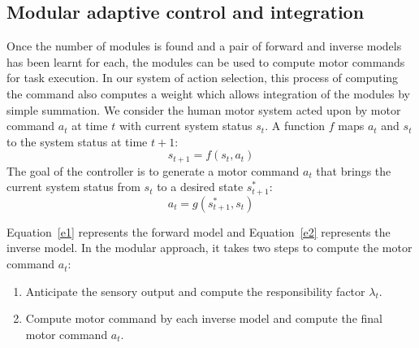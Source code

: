 \subsection{Modular adaptive control and integration}
\label{sec:control}

Once the number of modules is found and a pair of forward and inverse
models has been learnt for each, the modules can be used to compute
motor commands for task execution.  In our system of action selection,
this process of computing the command also computes a weight which
allows integration of the modules by simple summation.  We consider
the human motor system acted upon by motor command $a_t$ at time $t$
with current system status $s_t$. A function $f$ maps $a_t$ and $s_t$
to the system status at time $t+1$:
\begin{equation}
\label{e1}
s_{t+1} = f\left(s_t,a_t\right)
\end{equation}
The goal of the controller is to generate a motor command $a_t$ that
brings the current system status from $s_t$ to a desired state $s^*_{t+1}$:
\begin{equation}
\label{e2}
a_t = g\left({s^*_{t+1},s_t}\right)
\end{equation}

Equation~\ref{e1} represents the forward model and Equation~\ref{e2} represents the inverse model. In the modular approach, it takes two steps to compute the motor command $a_t$:
\begin{enumerate}
\item Anticipate the sensory output and compute the responsibility factor $\lambda_t$.
\item Compute motor command by each inverse model and compute the final motor command $a_t$.
\end{enumerate}


